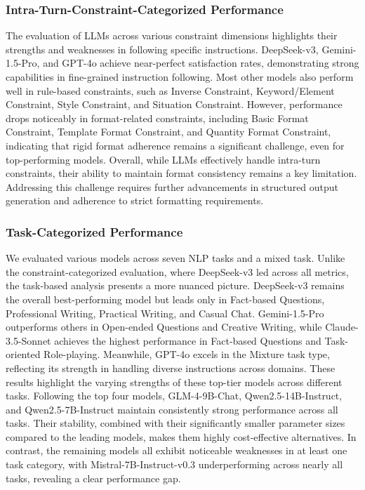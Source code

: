 \subsubsection*{Intra-Turn-Constraint-Categorized Performance}

The evaluation of LLMs across various constraint dimensions highlights their strengths and weaknesses in following specific instructions. 
DeepSeek-v3, Gemini-1.5-Pro, and GPT-4o achieve near-perfect satisfaction rates, demonstrating strong capabilities in fine-grained instruction following.
Most other models also perform well in rule-based constraints, such as Inverse Constraint, Keyword/Element Constraint, Style Constraint, and Situation Constraint.
However, performance drops noticeably in format-related constraints, including Basic Format Constraint, Template Format Constraint, and Quantity Format Constraint, indicating that rigid format adherence remains a significant challenge, even for top-performing models.
Overall, while LLMs effectively handle intra-turn constraints, their ability to maintain format consistency remains a key limitation. 
Addressing this challenge requires further advancements in structured output generation and adherence to strict formatting requirements.

\subsubsection*{Task-Categorized Performance}

We evaluated various models across seven NLP tasks and a mixed task.
Unlike the constraint-categorized evaluation, where DeepSeek-v3 led across all metrics, the task-based analysis presents a more nuanced picture. 
DeepSeek-v3 remains the overall best-performing model but leads only in Fact-based Questions, Professional Writing, Practical Writing, and Casual Chat.
Gemini-1.5-Pro outperforms others in Open-ended Questions and Creative Writing, while Claude-3.5-Sonnet achieves the highest performance in Fact-based Questions and Task-oriented Role-playing. 
Meanwhile, GPT-4o excels in the Mixture task type, reflecting its strength in handling diverse instructions across domains. 
These results highlight the varying strengths of these top-tier models across different tasks.
Following the top four models, GLM-4-9B-Chat, Qwen2.5-14B-Instruct, and Qwen2.5-7B-Instruct maintain consistently strong performance across all tasks. 
Their stability, combined with their significantly smaller parameter sizes compared to the leading models, makes them highly cost-effective alternatives.
In contrast, the remaining models all exhibit noticeable weaknesses in at least one task category, with Mistral-7B-Instruct-v0.3 underperforming across nearly all tasks, revealing a clear performance gap. 

